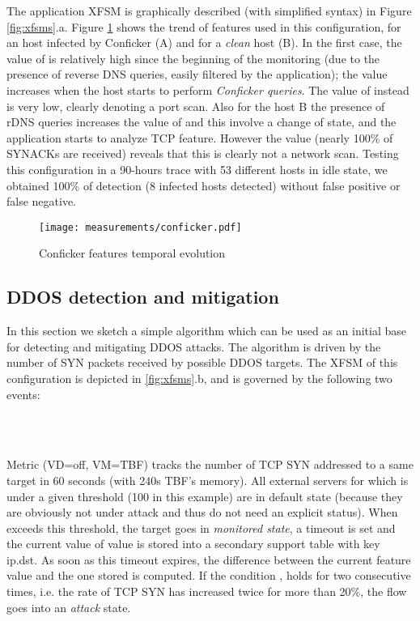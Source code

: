 \documentclass[conference,letterpaper]{sig-alternate-10pt}
\begin{document}
The application XFSM is graphically described (with simplified syntax) in Figure \ref{fig:xfsms}.a. Figure \ref{fig:conficker} shows the trend of features used in this configuration, for an host infected by Conficker (A) and for a \emph{clean} host (B). In the first case, the value of  is relatively high since the beginning of the monitoring (due to the presence of reverse DNS queries, easily filtered by the application); the value increases when the host starts to perform \emph{Conficker queries}. The value of  instead is very low, clearly denoting a port scan. Also for the host B the presence of rDNS queries increases the value of  and this involve a change of state, and the application starts to analyze TCP feature. However the  value (nearly 100\% of SYNACKs are received) reveals that this is clearly not a network scan. Testing this configuration in a 90-hours trace with 53 different hosts in idle state, we obtained 100\% of detection (8 infected hosts detected) without false positive or false negative.

\begin{figure}[t]
	\centering
	\texttt{[image: measurements/conficker.pdf]}
	\caption{Conficker features temporal evolution}
	\vspace*{-.5cm}
	\label{fig:conficker}
\end{figure}

\subsection{DDOS detection and mitigation}
\label{ss:use-ddos}
In this section we sketch a simple algorithm which can be used as an initial base for detecting and mitigating DDOS attacks. The algorithm is driven by the number of SYN packets received by possible DDOS targets.  The XFSM of this configuration is depicted in \ref{fig:xfsms}.b, and is governed by the following two events:
\\
\begin{footnotesize}
 \\
 \\
\end{footnotesize}

Metric  (VD=off, VM=TBF) tracks the number of TCP SYN addressed to a same target in 60 seconds (with 240s TBF's memory).  All external servers for which  is under a given threshold (100 in this example) are in default state (because they are obviously not under attack and thus do not need an explicit status). When  exceeds this threshold,  the target goes in \emph{monitored state}, a timeout is set and the current value of  value is stored into a secondary support table with key ip.dst.  As soon as this timeout expires, the difference between the current feature value and the one stored is computed. If the condition , holds for two consecutive times, i.e. the rate of TCP SYN has increased twice for more than 20\%, the flow goes into an \emph{attack} state.
\end{document}
